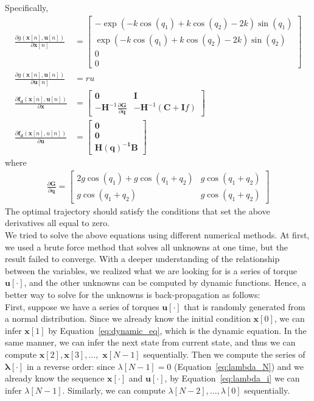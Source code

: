 Specifically, 
\begin{align}
\frac{\partial g(\mathbf x[n],\mathbf u[n])}{\partial \mathbf x[n]} &= \begin{bmatrix} -\exp(-k\cos(q_1) + k\cos(q_2) - 2k)\sin(q_1)\\ \exp(-k\cos(q_1) + k\cos(q_2) - 2k)\sin(q_2) \\0\\0 \end{bmatrix}\nonumber \\
\frac{\partial g(\mathbf x[n],\mathbf u[n])}{\partial \mathbf u[n]} &= ru \nonumber \\
\frac{\partial{\mathbf{f_d}(\mathbf x[n],\mathbf u[n])}}{\partial \mathbf x} &= \begin{bmatrix} \mathbf 0 & \mathbf I \\ - \mathbf H^{-1} \frac{{\partial \mathbf G}}{{\partial \mathbf q}}   & -\mathbf H^{-1} {(\mathbf C+ \mathbf I f)}  \end{bmatrix} \nonumber \\
\frac{\partial{\mathbf{f_d}(\mathbf x[n], u[n])}}{\partial \mathbf u} & =  \begin{bmatrix} \mathbf 0 \\ \mathbf 0 \\ \mathbf{H(q)^{-1}B} \end{bmatrix} \nonumber
\end{align}
where 
\begin{align}
\frac{{\partial \mathbf G}}{{\partial \mathbf q}} = \begin{bmatrix} 2g\cos(q_1) + g\cos(q_1+q_2) & g\cos(q_1+q_2)\\
g\cos(q_1+q_2) & g\cos(q_1+q_2) \end{bmatrix} \nonumber
\end{align}
The optimal trajectory should satisfy the conditions that set the above derivatives all equal to zero. \\
\null \quad We tried to solve the above equations using different numerical methods. At first, we used a brute force method that solves all unknowns at one time, but the result failed to converge. With a deeper understanding of the relationship between the variables, we realized what we are looking for is a series of torque $\mathbf{u}[\cdot]$, and the other unknowns can be computed by dynamic functions. Hence, a better way to solve for the unknowns is back-propagation as follows:\\
\null \quad First, suppose we have a series of torques $\mathbf{u}[\cdot]$ that is randomly generated from a normal distribution. Since we already know the initial condition $\mathbf x[0]$, we can infer $\mathbf x[1]$ by Equation~\ref{eq:dynamic_eq}, which is the dynamic equation. In the same manner, we can infer the next state from current state, and thus we can compute $\mathbf x[2], \mathbf x[3], ..., $ $\mathbf x[N-1]$ sequentially. Then we compute the series of $\mathbf \lambda[\cdot]$ in a reverse order: since $\lambda[N-1] = 0$ (Equation~\ref{eq:lambda_N}) and we already know the sequence $\mathbf x[\cdot]$ and $\mathbf u[\cdot]$, by Equation~\ref{eq:lambda_i} we can infer $\lambda[N-1]$. Similarly, we can compute $\lambda[N-2], ..., \lambda[0]$ sequentially.\\
